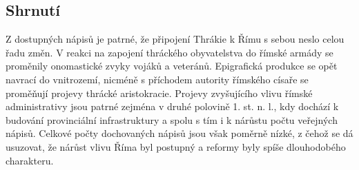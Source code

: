 
\subsection[shrnutí-15]{Shrnutí}

Z dostupných nápisů je patrné, že připojení Thrákie k Římu s sebou neslo celou řadu změn. V reakci na zapojení thráckého obyvatelstva do římské armády se proměnily onomastické zvyky vojáků a veteránů. Epigrafická produkce se opět navrací do vnitrozemí, nicméně s příchodem autority římského císaře se proměňují projevy thrácké aristokracie. Projevy zvyšujícího vlivu římské administrativy jsou patrné zejména v druhé polovině 1. st. n. l., kdy dochází k budování provinciální infrastruktury a spolu s tím i k nárůstu počtu veřejných nápisů. Celkové počty dochovaných nápisů jsou však poměrně nízké, z čehož se dá usuzovat, že nárůst vlivu Říma byl postupný a reformy byly spíše dlouhodobého charakteru.

